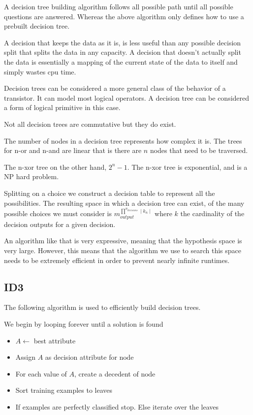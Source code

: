 \documentclass{article}
\begin{document}
A decision tree building algorithm follows all possible path until all possible
questions are answered. Whereas the above algorithm only defines how to use
a prebuilt decision tree. 

A decision that keeps the data as it is, is less useful than any possible 
decision split that splits the data in any capacity. A decision that doesn't
actually split the data is essentially a mapping of the current state of the
data to itself and simply wastes cpu time. 

Decision trees can be considered a more general class of the behavior of a
transistor. It can model most logical operators. A decision tree can be
considered a form of logical primitive in this case.

Not all decision trees are commutative but they do exist.

The number of nodes in a decision tree represents how complex it is. The 
trees for n-or and n-and are linear that is there are $n$ nodes that need
to be traversed. 

The n-xor tree on the other hand, $2^n - 1$. The n-xor tree is exponential, and
is a NP hard problem. 

Splitting on a choice we construct a decision table to represent all the 
possibilities. The resulting space in which a decision tree can exist, of the 
many possible choices we must consider is
$m_{output}^{\prod^{n_{decisions}}\mid k_n\mid}$ where $k$ the cardinality
of the decision outputs for a given decision. 

An algorithm like that is very expressive, meaning that the hypothesis space is
very large. However, this means that the algorithm we use to search this space
needs to be extremely efficient in order to prevent nearly infinite runtimes. 

\subsection{ID3}

The following algorithm is used to efficiently build decision trees.

We begin by looping forever until a solution is found
\begin{itemize}
    \item $A \leftarrow$ best attribute
    \item Assign $A$ as decision attribute for $\text{node}$
    \item For each value of $A$, create a decedent of $\text{node}$
    \item Sort training examples to leaves
    \item If examples are perfectly classified stop. Else iterate over the
        leaves
\end{itemize}
\end{document}
